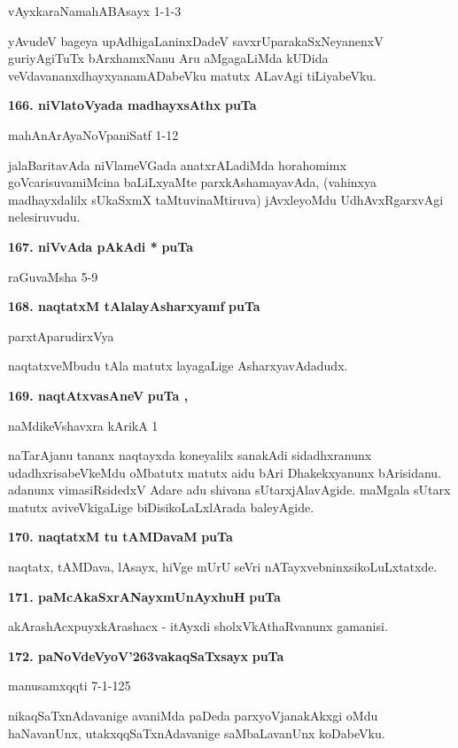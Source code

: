 \hfill{vAyxkaraNamahABAsayx 1-1-3}

\smallskip
yAvudeV bageya upAdhigaLaninxDadeV savxrUparakaSxNeyanenxV guriyAgiTuTx bArxhamxNanu Aru aMga\-gaLiMda kUDida veVdavananxdhayxyanamADabeVku matutx ALavAgi tiLiyabeVku.

\medskip
\noindent
\textbf{166. niVlatoVyada madhayxsAthx} \hfill{\bf puTa \pageref{166}}

\hfill{mahAnArAyaNoVpaniSatf 1-12}

\smallskip
jalaBaritavAda niVlameVGada anatxrALadiMda horahomimx goVcarisuva\break miMcina baLiLxyaMte parxkAsha\-mayavAda, (vahinxya madhayxdalilx sUkaSxmX taMtu\-vinaM\-tiruva) jAvxleyoMdu UdhAvxRgarxvAgi nelesiru\-vudu.

\medskip
\noindent
\textbf{167. niVvAda pAkAdi *} \hfill{\bf puTa \pageref{57}}

\hfill{raGuvaMsha 5-9}

\eject

\noindent
\textbf{168. naqtatxM tAlalayAsharxyamf} \hfill{\bf puTa \pageref{249}}

\hfill{parxtAparudirxVya}

\smallskip
naqtatxveMbudu tAla matutx layagaLige AsharxyavAdadudx.

\medskip
\noindent
\textbf{169. naqtAtxvasAneV} \hfill{\bf puTa \pageref{40}, \pageref{152}}

\hfill{naMdikeVshavxra kArikA 1}

\smallskip
naTarAjanu tananx naqtayxda koneyalilx sanakAdi sidadhxranunx udadhxrisabeVkeMdu oMbatutx matutx aidu bAri Dhakekxyanunx bArisidanu. adanunx vimasiRsidedxV Adare adu shivana sUtarxjAlavAgide. maMgala sUtarx matutx aviveVkigaLige biDisikoLaLxlArada baleyAgide.

\medskip
\noindent
\textbf{170. naqtatxM tu tAMDavaM} \hfill{\bf puTa \pageref{241}}

\smallskip
naqtatx, tAMDava, lAsayx, hiVge mUrU seVri nATayxvebninxsikoLuLxtatxde.

\medskip
\noindent
\textbf{171. paMcAkaSxrANayxmUnAyxhuH} \hfill{\bf puTa \pageref{161}}

\smallskip
akArashAcxpuyxkArashacx - itAyxdi sholxVkAthaRvanunx gamanisi.

\medskip
\noindent
\textbf{172. paNoVdeVyoV\char'263vakaqSaTxsayx} \hfill{\bf puTa \pageref{223}}

\hfill{manusamxqqti 7-1-125}

\smallskip
nikaqSaTxnAdavanige avaniMda paDeda parxyoVjanakAkxgi oMdu haNavanUnx, utakxqqSaTxnAdavanige saMbaLa\-vanUnx koDabeVku.

